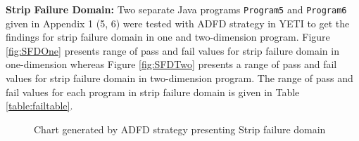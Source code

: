 \newpage
\noindent \textbf{Strip Failure Domain:} Two separate Java programs \verb+Program5+ and \verb+Program6+ given in Appendix 1 (5, 6) were tested with ADFD strategy in YETI to get the findings for strip failure domain in one and two-dimension program. Figure \ref{fig:SFDOne} presents range of pass and fail values for strip failure domain in one-dimension whereas Figure \ref{fig:SFDTwo} presents a range of pass and fail values for strip failure domain in two-dimension program. The range of pass and fail values for each program in strip failure domain is given in Table \ref{table:failtable}.


%
\begin{figure} [H]
\centering
{}
\bigskip
{}
\bigskip
\caption{Chart generated by ADFD strategy presenting Strip failure domain}
\end{figure}






